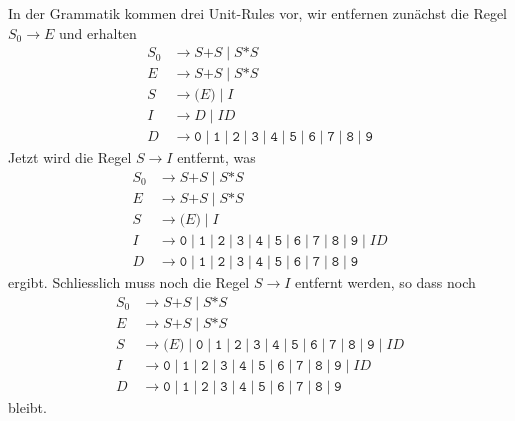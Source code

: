 \begin{loesung}
\begin{teilaufgaben}
In der Grammatik kommen drei Unit-Rules vor, wir entfernen zunächst die
Regel $S_0\to E$ und erhalten
\begin{align*}
S_0&\to S\texttt{+}S \mid  S\texttt{*}S \\
E&\to S\texttt{+}S \mid  S\texttt{*}S \\
S&\to \texttt{(}E\texttt{)} \mid  I \\
I&\to D \mid  I D \\
D&\to
\texttt{0}
\mid
\texttt{1}
\mid
\texttt{2}
\mid
\texttt{3}
\mid
\texttt{4}
\mid
\texttt{5}
\mid
\texttt{6}
\mid
\texttt{7}
\mid
\texttt{8}
\mid
\texttt{9}
\end{align*}
Jetzt wird die Regel $S\to I$ entfernt, was
\begin{align*}
S_0&\to S\texttt{+}S \mid S\texttt{*}S \\
E&\to S\texttt{+}S \mid S\texttt{*}S \\
S&\to \texttt{(}E\texttt{)} \mid I \\
I&\to 
\texttt{0}
\mid
\texttt{1}
\mid
\texttt{2}
\mid
\texttt{3}
\mid
\texttt{4}
\mid
\texttt{5}
\mid
\texttt{6}
\mid
\texttt{7}
\mid
\texttt{8}
\mid
\texttt{9}
\mid I D \\
D&\to
\texttt{0}
\mid
\texttt{1}
\mid
\texttt{2}
\mid
\texttt{3}
\mid
\texttt{4}
\mid
\texttt{5}
\mid
\texttt{6}
\mid
\texttt{7}
\mid
\texttt{8}
\mid
\texttt{9}
\end{align*}
ergibt.
Schliesslich muss noch die Regel $S\to I$ entfernt werden, so dass noch
\begin{align*}
S_0&\to S\texttt{+}S \mid S\texttt{*}S \\
E&\to S\texttt{+}S \mid S\texttt{*}S \\
S&\to \texttt{(}E\texttt{)} \mid
\texttt{0}
\mid
\texttt{1}
\mid
\texttt{2}
\mid
\texttt{3}
\mid
\texttt{4}
\mid
\texttt{5}
\mid
\texttt{6}
\mid
\texttt{7}
\mid
\texttt{8}
\mid
\texttt{9}
\mid I D \\
I&\to 
\texttt{0}
\mid
\texttt{1}
\mid
\texttt{2}
\mid
\texttt{3}
\mid
\texttt{4}
\mid
\texttt{5}
\mid
\texttt{6}
\mid
\texttt{7}
\mid
\texttt{8}
\mid
\texttt{9}
\mid I D \\
D&\to
\texttt{0}
\mid
\texttt{1}
\mid
\texttt{2}
\mid
\texttt{3}
\mid
\texttt{4}
\mid 
\texttt{5}
\mid 
\texttt{6}
\mid 
\texttt{7}
\mid 
\texttt{8}
\mid 
\texttt{9}
\end{align*}
bleibt.


\end{teilaufgaben}
\end{loesung}
